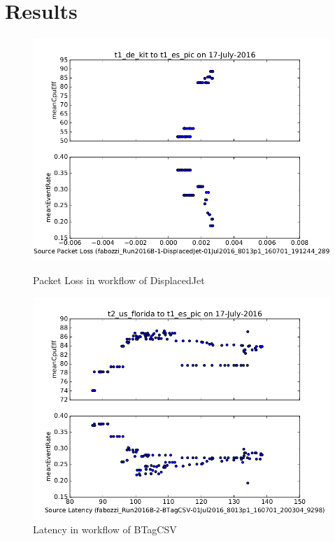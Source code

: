 \documentclass[sigconf]{acmart}
\begin{document}
\section{Results}
\begin{figure}[!htb]
		\includegraphics[width=\linewidth]{displacedjet_kit_pic}
		\caption{Packet Loss in workflow of DisplacedJet}
		\label{fig:displacedjet}
	\endminipage\hfill
		\includegraphics[width=\linewidth]{btagcsv_us_pic}
		\caption{Latency in workflow of BTagCSV}
		\label{fig:btagcsv}
	\endminipage\hfill

\end{figure}
\end{document}
